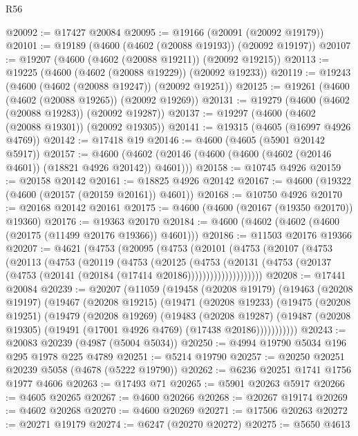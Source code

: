 \begin{lexlean}{R56}
\begin{coremodule}
@20092 := @17427 @20084
@20095 := @19166 (@20091 (@20092 @19179))
@20101 := @19189 (@4600 (@4602 (@20088 @19193)) (@20092 @19197))
@20107 := @19207 (@4600 (@4602 (@20088 @19211)) (@20092 @19215))
@20113 := @19225 (@4600 (@4602 (@20088 @19229)) (@20092 @19233))
@20119 := @19243 (@4600 (@4602 (@20088 @19247)) (@20092 @19251))
@20125 := @19261 (@4600 (@4602 (@20088 @19265)) (@20092 @19269))
@20131 := @19279 (@4600 (@4602 (@20088 @19283)) (@20092 @19287))
@20137 := @19297 (@4600 (@4602 (@20088 @19301)) (@20092 @19305))
@20141 := @19315 (@4605 (@16997 @4926 @4769))
@20142 := @17418 @19
@20146 := @4600 (@4605 (@5901 @20142 @5917))
@20157 := @4600 (@4602 (@20146 (@4600 (@4600 (@4602 (@20146 @4601)) (@18821 @4926 @20142)) @4601)))
@20158 := @10745 @4926
@20159 := @20158 @20142
@20161 := @18825 @4926 @20142
@20167 := @4600 (@19322 (@4600 (@20157 (@20159 @20161)) @4601))
@20168 := @10750 @4926
@20170 := @20168 @20142 @20161
@20175 := @4600 (@4600 (@20167 (@19350 @20170)) @19360)
@20176 := @19363 @20170
@20184 := @4600 (@4602 (@4602 (@4600 (@20175 (@11499 @20176 @19366)) @4601)))
@20186 := @11503 @20176 @19366
@20207 := @4621
    (@4753
      (@20095
        (@4753
          (@20101
            (@4753
              (@20107
                (@4753
                  (@20113
                    (@4753
                      (@20119
                        (@4753
                          (@20125
                            (@4753
                              (@20131
                                (@4753
                                  (@20137 (@4753 (@20141 (@20184 (@17414 @20186))))))))))))))))))))
@20208 := @17441 @20084
@20239 := @20207
    (@11059
      (@19458
        (@20208 @19179)
        (@19463
          (@20208 @19197)
          (@19467
            (@20208 @19215)
            (@19471
              (@20208 @19233)
              (@19475
                (@20208 @19251)
                (@19479
                  (@20208 @19269)
                  (@19483
                    (@20208 @19287)
                    (@19487 (@20208 @19305) (@19491 (@17001 @4926 @4769) (@17438 @20186)))))))))))
@20243 := @20083 @20239 (@4987 (@5004 @5034))
@20250 := @4994 @19790 @5034 @196 @295 @1978 @225 @4789
@20251 := @5214 @19790
@20257 := @20250 @20251 @20239 @5058 (@4678 (@5222 @19790))
@20262 := @6236 @20251 @1741 @1756 @1977 @4606
@20263 := @17493 @71
@20265 := @5901 @20263 @5917
@20266 := @4605 @20265
@20267 := @4600 @20266
@20268 := @20267 @19174
@20269 := @4602 @20268
@20270 := @4600 @20269
@20271 := @17506 @20263
@20272 := @20271 @19179
@20274 := @6247 (@20270 @20272)
@20275 := @5650 @4613

\end{coremodule}
\end{lexlean}

